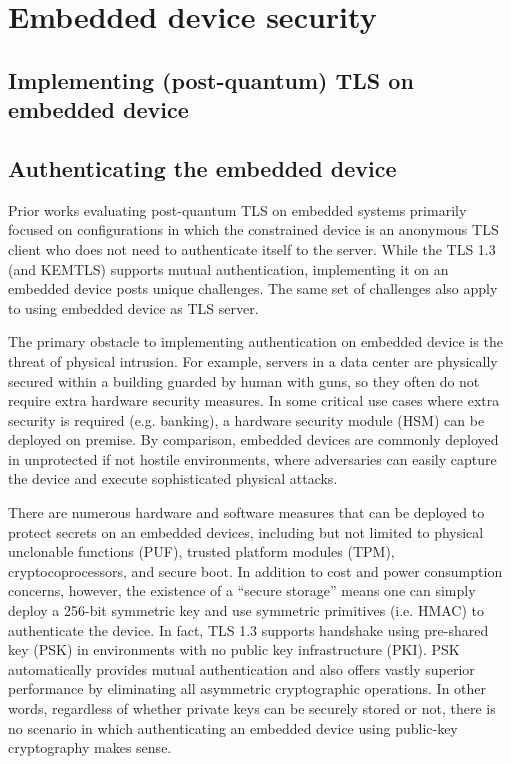 \documentclass[letterpaper,12pt,titlepage,oneside,final]{book}
\begin{document}
\section{Embedded device security}
\subsection{Implementing (post-quantum) TLS on embedded device}

\subsection{Authenticating the embedded device}
Prior works \cite{cryptoeprint:2021/1553,DBLP:conf/ccs/Burstinghaus-Steinbach20,DBLP:conf/space/GonzalezW22} evaluating post-quantum TLS on embedded systems primarily focused on configurations in which the constrained device is an anonymous TLS client who does not need to authenticate itself to the server. 
While the TLS 1.3 (and KEMTLS) supports mutual authentication, implementing it on an embedded device posts unique challenges. 
The same set of challenges also apply to using embedded device as TLS server.

The primary obstacle to implementing authentication on embedded device is the threat of physical intrusion. 
For example, servers in a data center are physically secured within a building guarded by human with guns, so they often do not require extra hardware security measures. 
In some critical use cases where extra security is required (e.g. banking), a hardware security module (HSM) can be deployed on premise. 
By comparison, embedded devices are commonly deployed in unprotected if not hostile environments, where adversaries can easily capture the device and execute sophisticated physical attacks.

There are numerous hardware and software measures that can be deployed to protect secrets on an embedded devices, including but not limited to physical unclonable functions (PUF), trusted platform modules (TPM), cryptocoprocessors, and secure boot. 
In addition to cost and power consumption concerns, however, the existence of a ``secure storage'' means one can simply deploy a 256-bit symmetric key and use symmetric primitives (i.e. HMAC) to authenticate the device. 
In fact, TLS 1.3 supports handshake using pre-shared key (PSK)\cite{DBLP:journals/rfc/rfc8446} in environments with no public key infrastructure (PKI).
PSK automatically provides mutual authentication and also offers vastly superior performance by eliminating all asymmetric cryptographic operations.
In other words, regardless of whether private keys can be securely stored or not, there is no scenario in which authenticating an embedded device using public-key cryptography makes sense.
\end{document}
